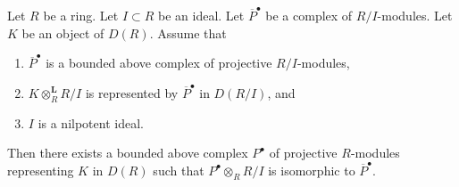 \begin{lemma}
\label{lemma-lift-complex-projectives}
Let $R$ be a ring. Let $I \subset R$ be an ideal. Let $\overline{P}^\bullet$
be a complex of $R/I$-modules. Let $K$ be an object of $D(R)$. Assume that
\begin{enumerate}
\item $\overline{P}^\bullet$ is a bounded above complex of
projective $R/I$-modules,
\item $K \otimes_R^\mathbf{L} R/I$ is represented by
$\overline{P}^\bullet$ in $D(R/I)$, and
\item $I$ is a nilpotent ideal.
\end{enumerate}
Then there exists a bounded above complex $P^\bullet$ of projective
$R$-modules representing $K$ in $D(R)$ such that $P^\bullet \otimes_R R/I$
is isomorphic to $\overline{P}^\bullet$.
\end{lemma}

